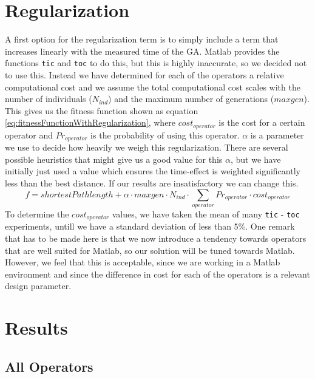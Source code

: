 \documentclass[a4paper]{article}
\begin{document}
\section{Regularization}
A first option for the regularization term is to simply include a term that increases linearly with the measured time of the GA. Matlab provides the functions \texttt{tic} and \texttt{toc} to do this, but this is highly inaccurate, so we decided not to use this. Instead we have determined for each of the operators a relative computational cost and we assume the total computational cost scales with the number of individuals ($N_{ind}$) and the maximum number of generations ($maxgen$). This gives us the fitness function shown as equation \ref{eq:fitnessFunctionWithRegularization}, where $cost_{operator}$ is the cost for a certain operator and $Pr_{operator}$ is the probability of using this operator. $\alpha$ is a parameter we use to decide how heavily we weigh this regularization. There are several possible heuristics that might give us a good value for this $\alpha$, but we have initially just used a value which ensures the time-effect is weighted significantly less than the best distance. If our results are insatisfactory we can change this.
\begin{equation}
f=shortestPathlength + \alpha\cdot maxgen\cdot N_{ind}\cdot \sum_{operator}Pr_{operator}\cdot cost_{operator}
\label{eq:fitnessFunctionWithRegularization}
\end{equation}
To determine the $cost_{operator}$ values, we have taken the mean of many \texttt{tic} - \texttt{toc} experiments, untill we have a standard deviation of less than 5\%. One remark that has to be made here is that we now introduce a tendency towards operators that are well suited for Matlab, so our solution will be tuned towards Matlab. However, we feel that this is acceptable, since we are working in a Matlab environment and since the difference in cost for each of the operators is a relevant design parameter.
\section{Results}



\FloatBarrier
\subsection{All Operators}
\end{document}
